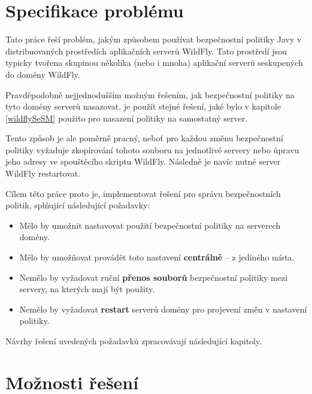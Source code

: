 \section{Specifikace problému} \label{specifikaceProblemu}

Tato práce řeší problém, jakým způsobem používat bezpečnostní politiky Javy v distribuovaných prostředích aplikačních serverů WildFly.
Tato prostředí jsou typicky tvořena skupinou několika (nebo i mnoha) aplikační serverů seskupených do domény WildFly.

Pravděpodobně nejjednodušším možným řešením, jak bezpečnostní politiky na tyto domény serverů nasazovat, je použít stejné řešení, jaké bylo v kapitole \ref{wildflySeSM} použito pro nasazení politiky na samostatný server.

Tento způsob je ale poměrně pracný, neboť pro každou změnu bezpečnostní politiky vyžaduje zkopírování tohoto souboru na jednotlivé servery nebo úpravu jeho adresy ve spouštěcího skriptu WildFly. Následně je navíc nutné server WildFly restartovat.

Cílem této práce proto je, implementovat řešení pro správu bezpečnostních politik, splňující následující požadavky:

\begin{itemize}
  \item Mělo by umožnit nastavovat použití bezpečnostní politiky na serverech domény.
  \item Mělo by umožňovat provádět toto nastavení {\bf centrálně} -- z jediného místa.
  \item Nemělo by vyžadovat ruční {\bf přenos souborů} bezpečnostní politiky mezi servery, na kterých mají být použity.
  \item Nemělo by vyžadovat {\bf restart} serverů domény pro projevení změn v nastavení politiky.
\end{itemize}

Návrhy řešení uvedených požadavků zpracovávají následující kapitoly.

\section{Možnosti řešení} \label{vycetMoznostiReseni}

